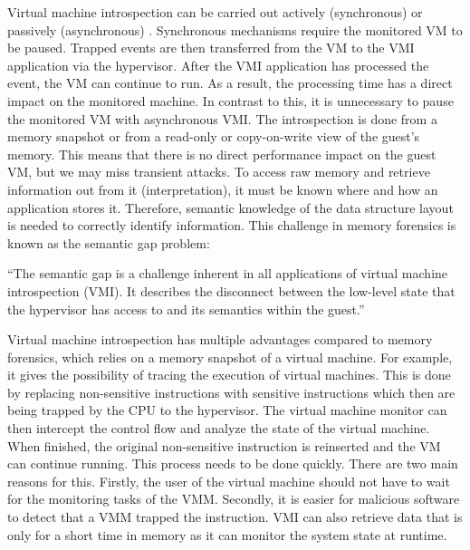\documentclass[sigconf]{acmart}
\begin{document}
Virtual machine introspection can be carried out actively (synchronous) or passively (asynchronous) \cite{6956590}.
\newline
\newline
Synchronous mechanisms require the monitored VM to be paused. Trapped events are then transferred from the VM to the VMI application via the hypervisor. After the VMI application has processed the event, the VM can continue to run. As a result, the processing time has a direct impact on the monitored machine. In contrast to this, it is unnecessary to pause the monitored VM with asynchronous VMI. The introspection is done from a memory snapshot or from a read-only or copy-on-write view of the guest's memory. This means that there is no direct performance impact on the guest VM, but we may miss transient attacks.
\newline
\newline
To access raw memory and retrieve information out from it (interpretation), it must be known where and how an application stores it. Therefore, semantic knowledge of the data structure layout is needed to correctly identify information. This challenge in memory forensics is known as the semantic gap problem:
\newline
\begin{definition}
 ``The semantic gap is a challenge inherent in all applications of virtual machine introspection (VMI). It describes the disconnect between the low-level state that the hypervisor has access to and its semantics within the guest.'' \cite{schneider2012bridging}
\newline
\end{definition}

Virtual machine introspection has multiple advantages compared to memory forensics, which relies on a memory snapshot of a virtual machine. For example, it gives the possibility of tracing the execution of virtual machines. This is done by replacing non-sensitive instructions with sensitive instructions which then are being trapped by the CPU to the hypervisor. The virtual machine monitor can then intercept the control flow and analyze the state of the virtual machine. When finished, the original non-sensitive instruction is reinserted and the VM can continue running. This process needs to be done quickly. There are two main reasons for this. Firstly, the user of the virtual machine should not have to wait for the monitoring tasks of the VMM. Secondly, it is easier for malicious software to detect that a VMM trapped the instruction. VMI can also retrieve data that is only for a short time in memory as it can monitor the system state at runtime.
\end{document}

